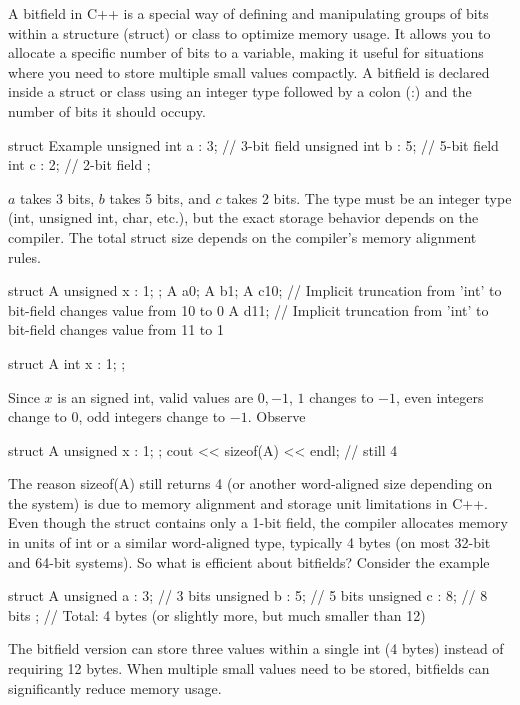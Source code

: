 \documentclass{report}
\begin{document}
\pagebreak 
{}
\bigbreak \noindent 
A bitfield in C++ is a special way of defining and manipulating groups of bits within a structure (struct) or class to optimize memory usage. It allows you to allocate a specific number of bits to a variable, making it useful for situations where you need to store multiple small values compactly.
\bigbreak \noindent 
A bitfield is declared inside a struct or class using an integer type followed by a colon (:) and the number of bits it should occupy.
\bigbreak \noindent 
\begin{cppcode}
struct Example {
    unsigned int a : 3;  // 3-bit field
    unsigned int b : 5;  // 5-bit field
    int c : 2;  // 2-bit field
};
\end{cppcode}
\bigbreak \noindent 
$a$ takes 3 bits, $b$ takes 5 bits, and $c$ takes 2 bits. The type must be an integer type (int, unsigned int, char, etc.), but the exact storage behavior depends on the compiler. The total struct size depends on the compiler's memory alignment rules.
\bigbreak \noindent 
\begin{cppcode}
struct A{
    unsigned x : 1;
};
A a{0};
A b{1};
A c{10}; // Implicit truncation from 'int' to bit-field changes value from 10 to 0
A d{11}; // Implicit truncation from 'int' to bit-field changes value from 11 to 1
\end{cppcode}
\bigbreak \noindent 
\begin{cppcode}
struct A{
    int x : 1;
};
\end{cppcode}
\bigbreak \noindent 
Since $x$ is an signed int, valid values are  $0,-1$, $1$ changes to $-1$, even integers change to $0$, odd integers change to $-1$.
\bigbreak \noindent 
Observe
\bigbreak \noindent 
\begin{cppcode}
    struct A{
        unsigned x : 1;
    };
    cout << sizeof(A) << endl; // still 4
\end{cppcode}
\bigbreak \noindent 
The reason sizeof(A) still returns 4 (or another word-aligned size depending on the system) is due to memory alignment and storage unit limitations in C++.
\bigbreak \noindent 
Even though the struct contains only a 1-bit field, the compiler allocates memory in units of int or a similar word-aligned type, typically 4 bytes (on most 32-bit and 64-bit systems).
\bigbreak \noindent 
So what is efficient about bitfields? Consider the example
\bigbreak \noindent 
\begin{cppcode}
struct A {
    unsigned a : 3;  // 3 bits
    unsigned b : 5;  // 5 bits
    unsigned c : 8;  // 8 bits
}; // Total: 4 bytes (or slightly more, but much smaller than 12)
\end{cppcode}
\bigbreak \noindent 
The bitfield version can store three values within a single int (4 bytes) instead of requiring 12 bytes.
\bigbreak \noindent 
When multiple small values need to be stored, bitfields can significantly reduce memory usage.
\end{document}
